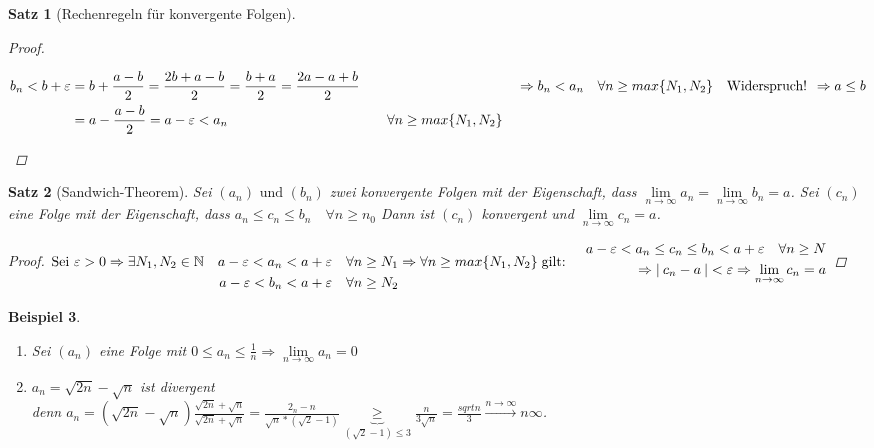 \documentclass[a4paper,titlepage,oneside]{article}
\def\N{\ensuremath{\mathbb{N}} }
\renewcommand{\epsilon}{\ensuremath{\varepsilon}}
\def\WSP{\text{Widerspruch! }}
\def\sp{\hspace{0,1cm}}
\renewcommand{\liminf}[2][n]{\ensuremath{\lim\limits_{#1 \rightarrow \infty}{#2}}}
\newcommand{\abs}[1]{\ensuremath{\left|\:#1\:\right|}}
\newcommand{\longtoinf}[1][n]{\ensuremath{\overset{\scriptscriptstyle{#1 \to \infty}}{\longrightarrow}}}
\theoremstyle{thmstyle}
\newtheorem{satz}{Satz}[subsection]
\newtheorem{bsp}[satz]{Beispiel}
\begin{document}
\begin{satz}[Rechenregeln für konvergente Folgen]
\begin{proof}
\begin{enumerate}
\begin{math}
\begin{aligned}[t]
b_n < b + \epsilon &= b + \frac{a-b}{2} = \frac{2b + a - b}{2} = \frac{b + a}{2} = \frac{2a - a + b}{2} \\
&= a - \frac{a-b}{2} = a - \epsilon < a_n && \quad \forall n \ge max\{N_1, N_2\} 
\end{aligned} \\ \vphantom{\frac{a-b}{2}}
\Rightarrow  b_n < a_n \quad \forall n \ge max\{N_1, N_2\} \quad \WSP \Rightarrow a \le b
\end{math}
\end{enumerate}
\end{proof}
\end{satz}

\begin{satz}[Sandwich-Theorem]
Sei \((a_n)\text{ und }(b_n)\) zwei konvergente Folgen mit der Eigenschaft, dass \(\liminf{a_n} = \liminf{b_n} = a\).
Sei \((c_n)\) eine Folge mit der Eigenschaft, dass \(a_n \le c_n \le b_n \quad \forall n \ge n_0\)
Dann ist \((c_n)\) konvergent und \(\liminf{c_n} = a\).
\begin{proof}
\begin{math} \displaystyle \text{Sei }\epsilon > 0 \Rightarrow \exists  N_1, N_2 \in \N \quad 
\begin{aligned}[t] a - \epsilon < a_n < a + \epsilon \quad \forall n \ge N_1 \\
			   a - \epsilon < b_n < a + \epsilon \quad \forall n \ge N_2 
\end{aligned} \\
\Rightarrow \forall n \ge max\{N_1, N_2\} \sp \text{gilt: } \quad \begin{aligned} a-\epsilon < a_n \le c_n \le b_n < a + \epsilon \quad  \forall n \ge N \\
\Rightarrow \abs{c_n - a} < \epsilon \Rightarrow \liminf{c_n} = a
\end{aligned}
\end{math}
\end{proof}
\end{satz}

\begin{bsp}
\begin{enumerate}
\item Sei \((a_n)\) eine Folge mit \(0 \le a_n \le \frac{1}{n} \Rightarrow \liminf{a_n} = 0\)
\item \(a_n = \sqrt{2n} - \sqrt{n}\) ist divergent\\
denn \(a_n = \left(\sqrt{2n} - \sqrt{n}\right)\frac{\sqrt{2n} + \sqrt{n}}{\sqrt{2n} + \sqrt{n}} = \frac{2_n - n}{\sqrt{n}*\left(\sqrt{2} - 1\right)} \underbrace{\ge}_{\left(\sqrt{2} - 1\right)\le 3} \frac{n}{3\sqrt{n}} = \frac{sqrt{n}}{3} \longtoinf{n} \infty\).
\end{enumerate}
\end{bsp}
\end{document}
